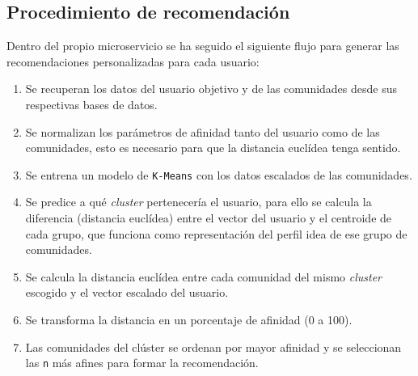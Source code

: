 \subsection*{Procedimiento de recomendación}

Dentro del propio microservicio se ha seguido el siguiente flujo para generar las recomendaciones personalizadas para cada usuario:

\begin{enumerate}[label=\textbf{\arabic*.}]
    \item Se recuperan los datos del usuario objetivo y de las comunidades desde sus respectivas bases de datos.
    \item Se normalizan los parámetros de afinidad tanto del usuario como de las comunidades, esto es necesario para que la distancia euclídea tenga sentido.
    \item Se entrena un modelo de \texttt{K-Means} con los datos escalados de las comunidades.
    \item Se predice a qué \textit{cluster} pertenecería el usuario, para ello se calcula la diferencia (distancia euclídea) entre el vector del usuario y el centroide de cada grupo, que funciona como representación del perfil idea de ese grupo de comunidades.
    \item Se calcula la distancia euclídea entre cada comunidad del mismo \textit{cluster} escogido y el vector escalado del usuario.
    \item Se transforma la distancia en un porcentaje de afinidad (0 a 100).
    \item Las comunidades del clúster se ordenan por mayor afinidad y se seleccionan las \texttt{n} más afines para formar la recomendación.
\end{enumerate}
\vspace{0.5em}

